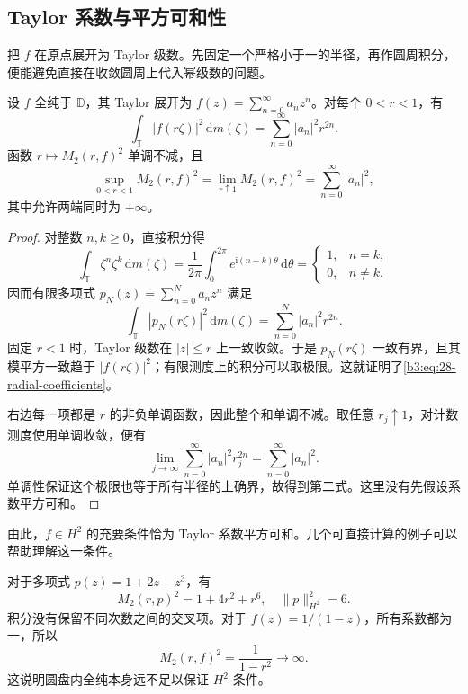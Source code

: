 \subsection{Taylor 系数与平方可和性}
\label{b3:subsec:280102}

把 \(f\) 在原点展开为 Taylor 级数。先固定一个严格小于一的半径，再作圆周积分，便能避免直接在收敛圆周上代入幂级数的问题。

\begin{proposition}[径向平均的系数公式]\label{b3:prop:28-radial-coefficients}
设 \(f\) 全纯于 \(\mathbb D\)，其 Taylor 展开为 \(f(z)=\sum_{n=0}^{\infty}a_nz^n\)。对每个 \(0<r<1\)，有
\begin{equation}\label{b3:eq:28-radial-coefficients}
 \int_{\mathbb T}|f(r\zeta)|^2\,\mathrm dm(\zeta)
 =\sum_{n=0}^{\infty}|a_n|^2r^{2n}.
\end{equation}
函数 \(r\mapsto M_2(r,f)^2\) 单调不减，且
\begin{equation}\label{b3:eq:28-hardy-coefficient-norm}
 \sup_{0<r<1}M_2(r,f)^2
 =\lim_{r\uparrow1}M_2(r,f)^2
 =\sum_{n=0}^{\infty}|a_n|^2,
\end{equation}
其中允许两端同时为 \(+\infty\)。
\end{proposition}
\begin{proof}
对整数 \(n,k\ge0\)，直接积分得
\[
 \int_{\mathbb T}\zeta^n\overline{\zeta^k}\,\mathrm dm(\zeta)
 =\frac1{2\pi}\int_0^{2\pi}e^{\mathrm i(n-k)\theta}\,\mathrm d\theta
 =\begin{cases}1,&n=k,\\0,&n\ne k.\end{cases}
\]
因而有限多项式 \(p_N(z)=\sum_{n=0}^Na_nz^n\) 满足
\[
 \int_{\mathbb T}|p_N(r\zeta)|^2\,\mathrm dm(\zeta)
 =\sum_{n=0}^N|a_n|^2r^{2n}.
\]
固定 \(r<1\) 时，Taylor 级数在 \(|z|\le r\) 上一致收敛。于是 \(p_N(r\zeta)\) 一致有界，且其模平方一致趋于 \(|f(r\zeta)|^2\)；有限测度上的积分可以取极限。这就证明了\eqref{b3:eq:28-radial-coefficients}。

右边每一项都是 \(r\) 的非负单调函数，因此整个和单调不减。取任意 \(r_j\uparrow1\)，对计数测度使用单调收敛，便有
\[
 \lim_{j\to\infty}\sum_{n=0}^{\infty}|a_n|^2r_j^{2n}
 =\sum_{n=0}^{\infty}|a_n|^2.
\]
单调性保证这个极限也等于所有半径的上确界，故得到第二式。这里没有先假设系数平方可和。
\end{proof}

由此，\(f\in H^2\) 的充要条件恰为 Taylor 系数平方可和。几个可直接计算的例子可以帮助理解这一条件。

\ProseParagraphBreak
对于多项式 \(p(z)=1+2z-z^3\)，有
\[
 M_2(r,p)^2=1+4r^2+r^6,
 \quad \|p\|_{H^2}^2=6.
\]
积分没有保留不同次数之间的交叉项。对于 \(f(z)=1/(1-z)\)，所有系数都为一，所以
\[
 M_2(r,f)^2=\frac1{1-r^2}\longrightarrow\infty.
\]
这说明圆盘内全纯本身远不足以保证 \(H^2\) 条件。

